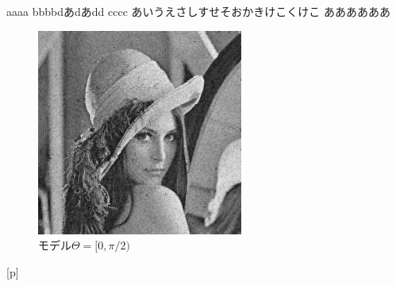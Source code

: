 \documentclass[a4]{ltjsbook}
\begin{document}
aaaa
bbbbdあdあdd
cccc
あいうえさしすせそおかきけこくけこ
ああああああ
\begin{figure}[b]
	\centering
    \includegraphics[width=\linewidth]{ista_IM}
    \caption{モデル$\Theta = [0,\pi/2)$}
    \label{fig:srexct}
\end{figure}[p]
\end{document}
